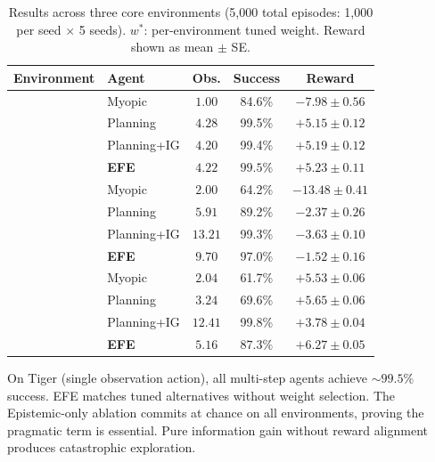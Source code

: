 \documentclass[runningheads]{llncs}
\begin{document}
\begin{table}[ht]
\centering
\caption{Results across three core environments (5{,}000 total episodes: 1{,}000 per seed $\times$ 5 seeds). $w^*$: per-environment tuned weight. Reward shown as mean $\pm$ SE.}
\label{tab:main}
\begin{small}
\begin{tabular}{llccc}
\toprule
Environment & Agent & Obs. & Success & Reward \\
\midrule
{} & Myopic & $1.00$ & 84.6\% & $-7.98 \pm 0.56$ \\
& Planning & $4.28$ & 99.5\% & $+5.15 \pm 0.12$ \\
& Planning+IG & $4.20$ & 99.4\% & $+5.19 \pm 0.12$ \\
& \textbf{EFE} & $\mathbf{4.22}$ & $\mathbf{99.5\%}$ & $\mathbf{+5.23 \pm 0.11}$ \\
\midrule
{} & Myopic & $2.00$ & 64.2\% & $-13.48 \pm 0.41$ \\
& Planning & $5.91$ & 89.2\% & $-2.37 \pm 0.26$ \\
& Planning+IG & $13.21$ & 99.3\% & $-3.63 \pm 0.10$ \\
& \textbf{EFE} & $\mathbf{9.70}$ & $\mathbf{97.0\%}$ & $\mathbf{-1.52 \pm 0.16}$ \\
\midrule
{} & Myopic & $2.04$ & 61.7\% & $+5.53 \pm 0.06$ \\
& Planning & $3.24$ & 69.6\% & $+5.65 \pm 0.06$ \\
& Planning+IG & $12.41$ & 99.8\% & $+3.78 \pm 0.04$ \\
& \textbf{EFE} & $\mathbf{5.16}$ & $\mathbf{87.3\%}$ & $\mathbf{+6.27 \pm 0.05}$ \\
\bottomrule
\end{tabular}
\end{small}
\end{table}

On Tiger (single observation action), all multi-step agents achieve ${\sim}99.5\%$ success. EFE matches tuned alternatives without weight selection. The Epistemic-only ablation commits at chance on all environments, proving the pragmatic term is essential. Pure information gain without reward alignment produces catastrophic exploration.
\end{document}
